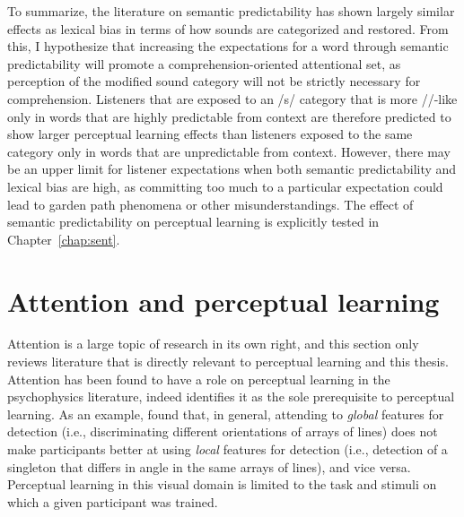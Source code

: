 To summarize, the literature on semantic predictability has shown largely similar effects as lexical bias in terms of how sounds are categorized and restored.  
From this, I hypothesize that increasing the expectations for a word through semantic predictability will promote a comprehension-oriented attentional set, as perception of the modified sound category will not be strictly necessary for comprehension.
Listeners that are exposed to an /s/ category that is more /\textesh/-like only in words that are highly predictable from context are therefore predicted to show larger perceptual learning effects than listeners exposed to the same category only in words that are unpredictable from context.
However, there may be an upper limit for listener expectations when both semantic predictability and lexical bias are high, as committing too much to a particular expectation could lead to garden path phenomena \citep{Levy2008} or other misunderstandings.
The effect of semantic predictability on perceptual learning is explicitly tested in Chapter~\ref{chap:sent}.

\section{Attention and perceptual learning}
\label{sec:attention}

Attention is a large topic of research in its own right, and this section only reviews literature that is directly relevant to perceptual learning and this thesis.
Attention has been found to have a role on perceptual learning in the psychophysics literature, indeed \citet{Gibson1953} identifies it as the sole prerequisite to perceptual learning.
As an example, \citet{Ahissar1993} found that, in general, attending to \emph{global} features for detection (i.e., discriminating different orientations of arrays of lines) does not make participants better at using \emph{local} features for detection (i.e., detection of a singleton that differs in angle in the same arrays of lines), and vice versa.  Perceptual learning in this visual domain is limited to the task and stimuli on which a given participant was trained.  

